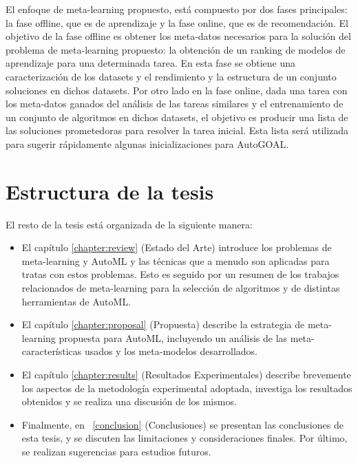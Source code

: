 El enfoque de meta-learning propuesto, está compuesto por dos fases principales: la fase offline, que es de aprendizaje y la fase online, que es de recomendación. El objetivo de la fase offline es obtener los meta-datos necesarios para la solución del problema de meta-learning propuesto: la obtención de un ranking de modelos de aprendizaje para una determinada tarea. En esta fase se obtiene una caracterización de los datasets y el rendimiento y la estructura de un conjunto soluciones en dichos datasets. Por otro lado en la fase online, dada una tarea con los meta-datos ganados del análisis de las tareas similares y el entrenamiento de un conjunto de algoritmos en dichos datasets, el objetivo es producir una lista de las soluciones prometedoras para resolver la tarea inicial. Esta lista será utilizada para sugerir rápidamente algunas inicializaciones para AutoGOAL.



\section*{Estructura de la tesis}

El resto de la tesis está organizada de la siguiente manera:

\begin{itemize}
	\item El capítulo \ref{chapter:review} (Estado del Arte) introduce los problemas de meta-learning y AutoML y las técnicas que a menudo son aplicadas para tratas con estos problemas. Esto es seguido por un resumen de los trabajos relacionados de meta-learning para la selección de algoritmos y de distintas herramientas de AutoML.
	\item El capítulo \ref{chapter:proposal} (Propuesta) describe la estrategia de meta-learning propuesta para AutoML, incluyendo un análisis de las meta-características usados y los meta-modelos desarrollados.
	\item El capítulo \ref{chapter:results} (Resultados Experimentales) describe brevemente los aspectos de la metodología experimental adoptada, investiga los resultados obtenidos y se realiza una discusión de los mismos.
	\item Finalmente, en ~\ref{conclusion} (Conclusiones) se presentan las conclusiones de esta tesis, y se discuten las limitaciones y consideraciones finales. Por último, se realizan sugerencias para estudios futuros.
\end{itemize}